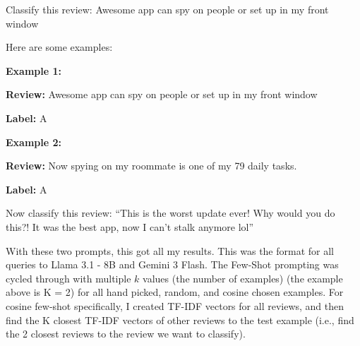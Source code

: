 \documentclass[12pt]{article}
\begin{document}
\vspace{0.5em}
\begin{tcbraster}[
    raster columns=2,
    raster column skip=0.04\textwidth,
    raster valign=top,
    colback=llmrowalt,
    colframe=llmheader,
    colbacktitle=llmheader,
    coltitle=white,
    fonttitle=\bfseries\small,
    fontupper=\ttfamily\small,
    boxrule=0.6pt,
    arc=3pt,
]
\begin{tcolorbox}[title=Zero-Shot]
Classify this review: Awesome app can spy on people or set up in my front window
\end{tcolorbox}
\begin{tcolorbox}[title=Few-Shot]
Here are some examples:

\textbf{Example 1:}

\textbf{Review:} Awesome app can spy on people or set up in my front window

\textbf{Label:} A

\textbf{Example 2:}

\textbf{Review:} Now spying on my roommate is one of my 79 daily tasks.

\textbf{Label:} A

Now classify this review: ``This is the worst update ever! Why would you do this?!
It was the best app, now I can't stalk anymore lol''
\end{tcolorbox}
\end{tcbraster}

\vspace{0.5em}

With these two prompts, this got all my results. This was the format for all queries to 
Llama 3.1 - 8B and Gemini 3 Flash. The Few-Shot prompting was cycled through 
with multiple $k$ values (the number of examples) (the example above is K = 2) 
for all hand picked, random, and cosine chosen examples. For cosine few-shot specifically, 
I created TF-IDF vectors for all reviews, and then find the K closest TF-IDF vectors of 
other reviews to the test example (i.e., find the 2 closest reviews to the review we 
want to classify).  

\vspace{0.5em}
\end{document}

